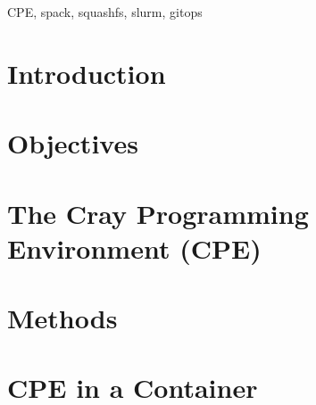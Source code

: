 \documentclass[conference]{IEEEtran}
\begin{document}
\begin{abstract}
    
\end{abstract}

\begin{IEEEkeywords}
CPE, spack, squashfs, slurm, gitops
\end{IEEEkeywords}

\section{Introduction}
\label{sec:introduction}


\section{Objectives}
\label{sec:objectives}


\section{The Cray Programming Environment (CPE)}
\label{sec:cpe}


\section{Methods}
\label{sec:methods}


\section{CPE in a Container}
\label{sec:cpe-container}


\end{document}
